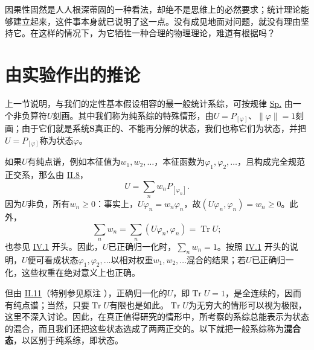 \documentclass[fontsize=13pt,twoside,openany,headings=normal,parskip=false,bookmarkpackage=false,DIV=calc]{scrbook}
\begin{document}
因果性固然是人人根深蒂固的一种看法，却绝不是思维上的必然要求；统计理论能够建立起来，这件事本身就已说明了这一点。没有成见地面对问题，就没有理由坚持它。在这样的情况下，为它牺牲一种合理的物理理论，难道有根据吗？

\section{由实验作出的推论}\label{sec:IV.3}
上一节说明，与我们的定性基本假设相容的最一般统计系综，可按规律 \hyperref[eq:IV.2.Sp]{Sp.} 由一个非负算符$U$刻画。其中我们称为纯系综的特殊情形，由$U=P_{[\varphi]}$、$\|\varphi\|=1$刻画；由于它们就是系统$\boldsymbol{S}$真正的、不能再分解的状态，我们也称它们为状态，并把$U=P_{[\varphi]}$称为状态$\varphi$。

如果$U$有纯点谱，例如本征值为$w_1,\allowbreak w_2,\allowbreak \ldots$，本征函数为$\varphi_1,\allowbreak \varphi_2,\allowbreak \ldots$，且构成完全规范正交系，那么由 \hyperref[sec:II.8]{II.8}，
\[
U=\sum_n w_nP_{[\varphi_n]}.
\]\hypertarget{origpage-174}{}\label{origpage-174}因为$U$非负，所有$w_n\geq0$：事实上，$U\varphi_n=w_n\varphi_n$，故$(U\varphi_n,\allowbreak \varphi_n)=w_n\geq0$。此外，
\[
\sum_nw_n=\sum_n(U\varphi_n,\varphi_n)=\operatorname{Tr}U;
\]
也参见 \hyperref[sec:IV.1]{IV.1} 开头。因此，$U$已正确归一化时，$\sum_nw_n=1$。按照 \hyperref[sec:IV.1]{IV.1} 开头的说明，$U$便可看成状态$\varphi_1,\allowbreak \varphi_2,\allowbreak \ldots$以相对权重$w_1,\allowbreak w_2,\allowbreak \ldots$混合的结果；若$U$已正确归一化，这些权重在绝对意义上也正确。

但由 \hyperref[sec:II.11]{II.11}（特别参见原注 \hyperlink{note-115}{}），正确归一化的$U$，即$\operatorname{Tr}U=1$，是全连续的，因而有纯点谱；当然，只要$\operatorname{Tr}U$有限也是如此。$\operatorname{Tr}U$为无穷大的情形可以视为极限，这里不深入讨论。因此，在真正值得研究的情形中，所考察的系综总能表示为状态的混合，而且我们还把这些状态选成了两两正交的。以下就把一般系综称为\textbf{混合态}，以区别于纯系综，即状态。
\end{document}
